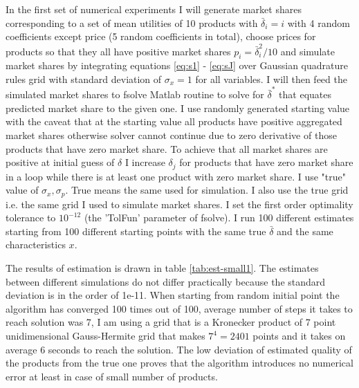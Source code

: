 \documentclass[12pt,letterpaper]{article}
\begin{document}
	In the first set of numerical experiments I will generate market shares corresponding to a set of mean utilities of 10 products with $\bar\delta_i = i$ with 4 random coefficients except price (5 random coefficients in total), choose prices for products so that they all have positive market shares $p_i = \bar \delta_i^2/10$ and simulate market shares by integrating equations \ref{eq:s1} - \ref{eq:sJ} over Gaussian quadrature rules grid with standard deviation of $\sigma_x=1$ for all variables. I will then feed the simulated market shares to fsolve Matlab routine to solve for $\bar\delta^*$ that equates predicted market share to the given one. I use randomly generated starting value with the caveat that at the starting value all products have positive aggregated market shares otherwise solver cannot continue due to zero derivative of those products that have zero market share. To achieve that all market shares are positive at initial guess of $\delta$ I increase $\delta_j$ for products that have zero market share in a loop while there is at least one product with zero market share. I use "true" value of $\sigma_x, \sigma_p$. True means the same used for simulation. I also use the true grid i.e. the same grid I used to simulate market shares. I set the first order optimality tolerance to $10^{-12}$ (the 'TolFun' parameter of fsolve). I run 100 different estimates starting from 100 different starting points with the same true $\bar \delta$ and the same characteristics $x$.
	
	The results of estimation is drawn in table \ref{tab:est-small1}. The estimates between different simulations do not differ practically because the standard deviation is in the order of 1e-11. When starting from random initial point the algorithm has converged 100 times out of 100, average number of steps it takes to reach solution was 7, I am using a grid that is a Kronecker product of 7 point unidimensional Gauss-Hermite grid that makes $7^4 = 2401$ points and it takes on average 6 seconds to reach the solution. The low deviation of estimated quality of the products from the true one proves that the algorithm introduces no numerical error at least in case of small number of products.
	
	
	
\end{document}
